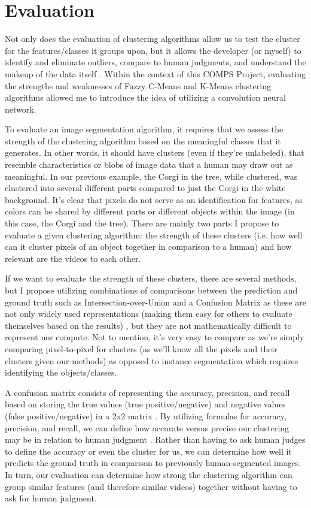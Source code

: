 \documentclass[10pt,twocolumn]{article}
\begin{document}
\section{Evaluation}

Not only does the evaluation of clustering algorithms allow us to test the cluster for the features/classes it groups upon, but it allows the developer (or myself) to identify and eliminate outliers, compare to human judgments, and understand the makeup of the data itself \cite{Lavrenko2014}. Within the context of this COMPS Project, evaluating the strengths and weaknesses of Fuzzy C-Means and K-Means clustering algorithms allowed me to introduce the idea of utilizing a convolution neural network.

To evaluate an image segmentation algorithm, it requires that we assess the strength of the clustering algorithm based on the meaningful classes that it generates. In other words, it should have clusters (even if they’re unlabeled), that resemble characteristics or blobs of image data that a human may draw out as meaningful. In our previous example, the Corgi in the tree, while clustered, was clustered into several different parts compared to just the Corgi in the white background. It’s clear that pixels do not serve as an identification for features, as colors can be shared by different parts or different objects within the image (in this case, the Corgi and the tree). There are mainly two parts I propose to evaluate a given clustering algorithm: the strength of these clusters (i.e. how well can it cluster pixels of an object together in comparison to a human) and how relevant are the videos to each other.

If we want to evaluate the strength of these clusters, there are several methods, but I propose utilizing combinations of comparisons between the prediction and ground truth such as Intersection-over-Union and a Confusion Matrix as these are not only widely used representations (making them easy for others to evaluate themselves based on the results) \cite{Mittal2021}, but they are not mathematically difficult to represent nor compute. Not to mention, it’s very easy to compare as we’re simply comparing pixel-to-pixel for clusters (as we’ll know all the pixels and their clusters given our methods) as opposed to instance segmentation which requires identifying the objects/classes.

A confusion matrix consists of representing the accuracy, precision, and recall based on storing the true values (true positive/negative) and negative values (false positive/negative) in a 2x2 matrix \cite{Jordan2018}. By utilizing formulas for accuracy, precision, and recall, we can define how accurate versus precise our clustering may be in relation to human judgment \cite{Jordan2018}. Rather than having to ask human judges to define the accuracy or even the cluster for us, we can determine how well it predicts the ground truth in comparison to previously human-segmented images. In turn, our evaluation can determine how strong the clustering algorithm can group similar features (and therefore similar videos) together without having to ask for human judgment.
\end{document}
